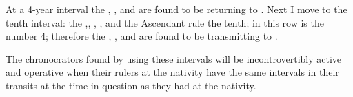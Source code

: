 At a 4-year interval the \Sun, \Jupiter, and \Mercury\xspace are found to be returning to \Saturn. Next I move to the tenth interval: the \Sun,\Mars, \Mercury, \Jupiter, and the Ascendant rule the tenth; in this row is the number 4; therefore the \Sun, \Mercury, and \Jupiter\xspace are found to be transmitting to \Saturn.

The chronocrators found by using these intervals will be incontrovertibly active and operative when their rulers at the nativity have the same intervals in their transits at the time in question as they had at the
nativity.
\newpage